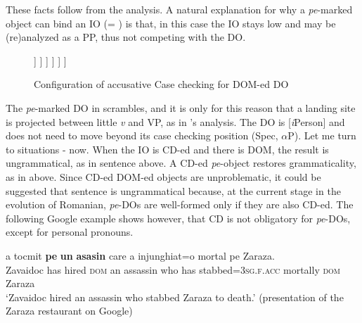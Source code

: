 \documentclass[output=paper,colorlinks,citecolor=brown,nonflat]{langsci/langscibook}
\begin{document}
These facts follow from the analysis. A natural explanation for why a \textit{pe}{}-marked object can bind an IO (= ) is that, in this case the IO stays low and may be (re)analyzed as a PP, thus not competing with the DO.

\begin{figure}%
	\begin{forest}
		[\textit{v}P
			[\textit{v}\\
				 {[}\textit{u}Case:\_\_{]}
			]
			[${\alpha}$P
				[KP\textsubscript{DO}\\
					 {[}\textit{i}Pers{]}\\
					 {[}\textit{u}Case:\textsc{acc}{]}
				]
				[${\alpha}$P
					[${\alpha}$'
					]
					[VP
						[<KP\textsubscript{DO}>
						]
						[V'
							[V]
							[PP
								[P]
								[DP\textsubscript{IO}]
							]
						]
					]
				]
			]
		]
	\end{forest}
	\caption{\label{fig:cornilescu:11} Configuration of accusative Case checking for DOM-ed DO}
\end{figure}


The \textit{pe}{}-marked DO in  scrambles, and it is only for this reason that a landing site is projected between little \textit{v} and VP, as in \citeauthor{López2012}’s analysis. The DO is [\textit{i}Person] and does not need to move beyond its case checking position (Spec, ${\alpha}$P). Let me turn to situations - now. When the IO is CD-ed and there is DOM, the result is ungrammatical, as in sentence  above. A CD-ed \textit{pe}{}-object restores grammaticality, as in  above. Since CD-ed DOM-ed objects are unproblematic, it could be suggested that sentence  is ungrammatical because, at the current stage in the evolution of Romanian, \textit{pe}{}-DOs are well-formed only if they are also CD-ed. The following Google example shows however, that CD is not obligatory for \textit{pe}{}-DOs, except for personal pronouns.
\newpage

\ea%
   \label{ex:cornilescu:31}
    {a} {tocmit} \textbf{pe} \textbf{un} \textbf{asasin} {care} {a} {injunghiat=o} {mortal} {pe} {Zaraza}.\\
       Zavaidoc has hired \textsc{dom} an assassin who has stabbed=\textsc{3sg.f.acc} mortally \textsc{dom} Zaraza\\
   \glt ‘Zavaidoc hired an assassin who stabbed Zaraza to death.’ (presentation of the Zaraza restaurant on Google)
   \z
\end{document}
